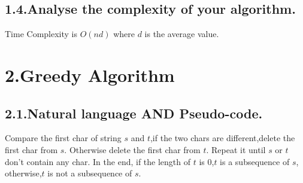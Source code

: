 \documentclass[10pt]{article}
\begin{document}
\subsection{1.4.\hspace*{0.5em}Analyse the complexity of your algorithm.}\label{sec-analyse-the-complexity-of-your-algorithm}%

\noindent{}Time Complexity is $O(nd)$ where $d$ is the average value.%

\section{2.\hspace*{0.5em}Greedy Algorithm}\label{sec-greedy-algorithm}%

\subsection{2.1.\hspace*{0.5em}Natural language AND Pseudo-code.}\label{sec-natural-language-and-pseudo-code}%

\noindent{}\hspace*{1em}Compare the first char of string $s$ and $t$,if the two chars are different,delete the first char from
$s$. Otherwise delete the first char from $t$. Repeat it until $s$ or $t$ don't contain any char. In the end,
if the length of $t$ is 0,$t$ is a subsequence of $s$, otherwise,$t$ is not a subsequence of $s$.   %

\mdhr{}%
\end{document}

